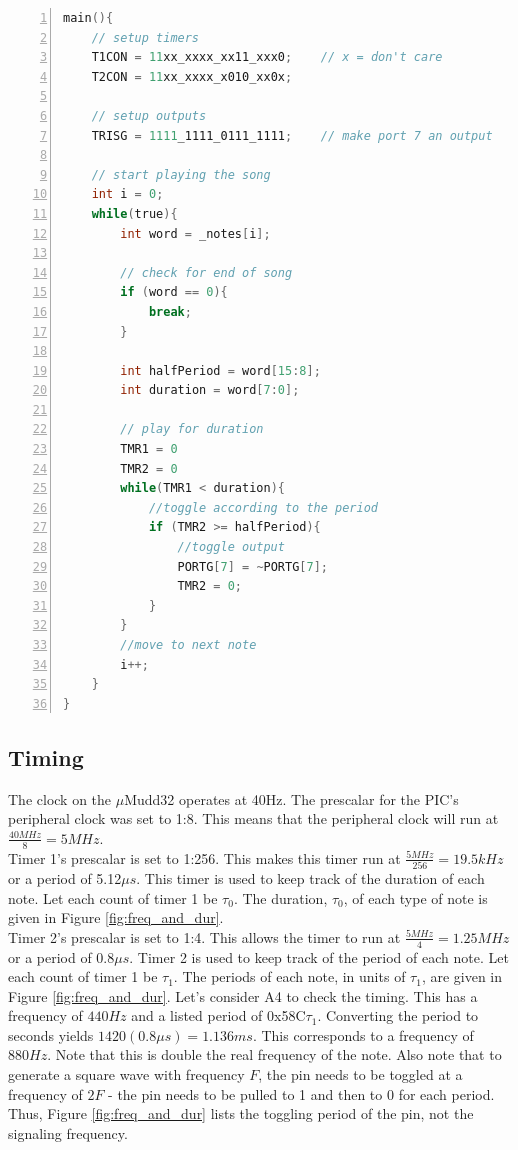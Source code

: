 \documentclass[11pt]{article}
\begin{document}
\begin{lstlisting}[numbers=left,language=C,basicstyle=\footnotesize]
main(){
    // setup timers
    T1CON = 11xx_xxxx_xx11_xxx0;    // x = don't care
    T2CON = 11xx_xxxx_x010_xx0x;

    // setup outputs
    TRISG = 1111_1111_0111_1111;    // make port 7 an output

    // start playing the song
    int i = 0;
    while(true){
        int word = _notes[i];

        // check for end of song
        if (word == 0){
            break;
        }

        int halfPeriod = word[15:8];
        int duration = word[7:0];

        // play for duration
        TMR1 = 0
        TMR2 = 0
        while(TMR1 < duration){
            //toggle according to the period
            if (TMR2 >= halfPeriod){
                //toggle output
                PORTG[7] = ~PORTG[7];
                TMR2 = 0;
            }
        }
        //move to next note
        i++;
    }
}

\end{lstlisting}


\subsection{Timing}

The clock on the $\mu$Mudd32 operates at 40Hz. The prescalar for the PIC's peripheral clock was set to 1:8. This means that the peripheral clock will run at $\frac{40MHz}{8} = 5MHz$. \\

Timer 1's prescalar is set to 1:256. This makes this timer run at $\frac{5MHz}{256} = 19.5kHz$ or a period of 5.12$\mu s$. This timer is used to keep track of the duration of each note. Let each count of timer 1 be $\tau_{0}$. The duration, $\tau_{0}$, of each type of note is given in Figure \ref{fig:freq_and_dur}. \\

Timer 2's prescalar is set to 1:4. This allows the timer to run at $\frac{5MHz}{4} = 1.25MHz$ or a period of 0.8$\mu s$. Timer 2 is used to keep track of the period of each note. Let each count of timer 1 be $\tau_{1}$. The periods of each note, in units of $\tau_{1}$, are given in Figure \ref{fig:freq_and_dur}. Let's consider A4 to check the timing. This has a frequency of $440Hz$ and a listed period of 0x58C$\tau_{1}$. Converting the period to seconds yields $1420(0.8\mu s) = 1.136ms$. This corresponds to a frequency of $880Hz$. Note that this is double the real frequency of the note. Also note that to generate a square wave with frequency $F$, the pin needs to be toggled at a frequency of $2F$ - the pin needs to be pulled to 1 and then to 0 for each period. Thus, Figure \ref{fig:freq_and_dur} lists the toggling period of the pin, not the signaling frequency. \\
\end{document}
